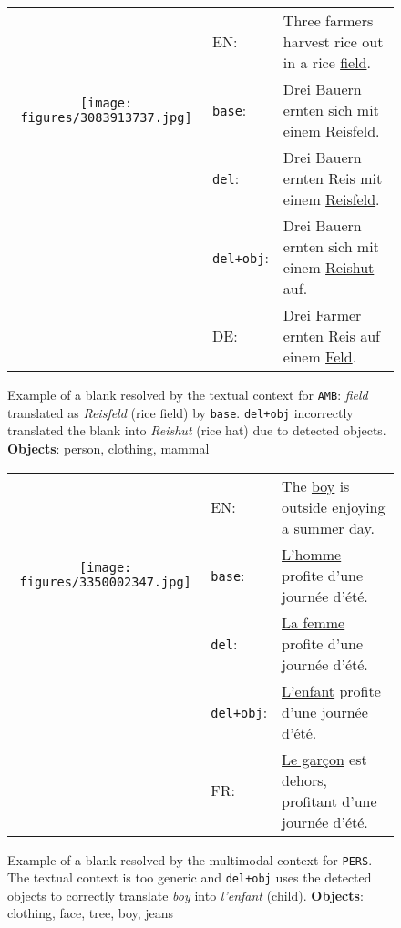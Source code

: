 \documentclass[11pt,a4paper]{article}
\newcommand{\base}{\texttt{base}\xspace}
\newcommand{\delib}{\texttt{del}\xspace}
\newcommand{\delibattobj}{\texttt{del+obj}\xspace}
\newcommand{\amb}{\texttt{AMB}\xspace}
\newcommand{\pers}{\texttt{PERS}\xspace}
\begin{document}
\begin{figure*}[ht]
\small{
  \begin{subfigure}[c]{\textwidth}
  \vspace{1em}
    \begin{tabular}{c p{1.5cm}p{9cm}}
      \multirow{3}[15]{*}{\texttt{[image: figures/3083913737.jpg]}} & EN: & Three farmers harvest rice out in a rice \underline{field}.\\[1ex]
      & \base: & Drei Bauern ernten sich mit einem \underline{Reisfeld}.  \\[1ex]
      & \delib: & Drei Bauern ernten Reis mit einem \underline{Reisfeld}.\\[1ex]
      & \delibattobj: & Drei Bauern ernten sich mit einem \underline{Reishut} auf. \\[1ex]
      & DE: & Drei Farmer ernten Reis auf einem \underline{Feld}. \\[1ex]
  \end{tabular}
  \caption{Example of a blank resolved by the textual context for \amb: \textit{field} translated as \textit{Reisfeld} (rice field) by \base. \delibattobj incorrectly translated the blank into \textit{Reishut} (rice hat) due to detected objects. \textbf{Objects}: person, clothing, mammal}
  \end{subfigure}
  \begin{subfigure}[c]{\textwidth}
  \vspace{1em}
    \begin{tabular}{c p{1.5cm}p{9cm}}
      \multirow{3}[15]{*}{\texttt{[image: figures/3350002347.jpg]}} & EN: & The \underline{boy} is outside enjoying a summer day.\\[1ex]
      & \base: & \underline{L'homme} profite d'une journ\'{e}e d'\'{e}t\'{e}.  \\[1ex]
      & \delib: & \underline{La femme} profite d'une journ\'{e}e d'\'{e}t\'{e}. \\[1ex]
      & \delibattobj: & \underline{L'enfant} profite d'une journ\'{e}e d'\'{e}t\'{e}. \\[1ex]
      & FR: & \underline{Le gar\c{c}on} est dehors, profitant d'une journ\'{e}e d'\'{e}t\'{e}. \\[1ex]
  \end{tabular}
  \caption{Example of a blank resolved by the multimodal context for \pers. The textual context is too generic and \delibattobj uses the detected objects to correctly translate \textit{boy} into \textit{l'enfant} (child). {\bf Objects}: clothing, face, tree, boy, jeans}

\end{subfigure}}
\end{figure*}
\end{document}
